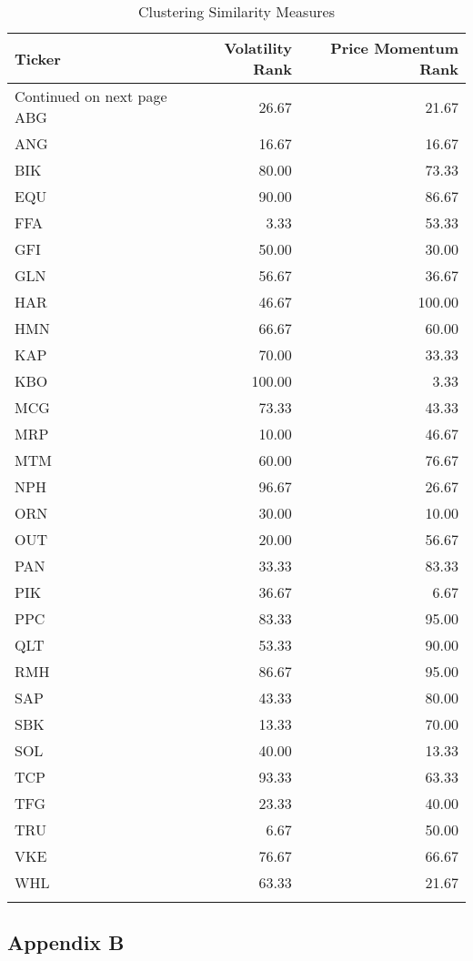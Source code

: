\documentclass[11pt,preprint, authoryear]{elsarticle}
\numberwithin{equation}{section}
\numberwithin{figure}{section}
\numberwithin{table}{section}
\begin{document}
\begingroup\fontsize{12pt}{13pt}\selectfont
\begin{longtable}{lrr}
  \toprule
Ticker & Volatility  Rank & Price Momentum Rank \\ 
  \hline 
\endhead 
\hline 
{\footnotesize Continued on next page} 
\endfoot 
\endlastfoot 
 \midrule
ABG & 26.67 & 21.67 \\ 
  ANG & 16.67 & 16.67 \\ 
  BIK & 80.00 & 73.33 \\ 
  EQU & 90.00 & 86.67 \\ 
  FFA & 3.33 & 53.33 \\ 
  GFI & 50.00 & 30.00 \\ 
  GLN & 56.67 & 36.67 \\ 
  HAR & 46.67 & 100.00 \\ 
  HMN & 66.67 & 60.00 \\ 
  KAP & 70.00 & 33.33 \\ 
  KBO & 100.00 & 3.33 \\ 
  MCG & 73.33 & 43.33 \\ 
  MRP & 10.00 & 46.67 \\ 
  MTM & 60.00 & 76.67 \\ 
  NPH & 96.67 & 26.67 \\ 
  ORN & 30.00 & 10.00 \\ 
  OUT & 20.00 & 56.67 \\ 
  PAN & 33.33 & 83.33 \\ 
  PIK & 36.67 & 6.67 \\ 
  PPC & 83.33 & 95.00 \\ 
  QLT & 53.33 & 90.00 \\ 
  RMH & 86.67 & 95.00 \\ 
  SAP & 43.33 & 80.00 \\ 
  SBK & 13.33 & 70.00 \\ 
  SOL & 40.00 & 13.33 \\ 
  TCP & 93.33 & 63.33 \\ 
  TFG & 23.33 & 40.00 \\ 
  TRU & 6.67 & 50.00 \\ 
  VKE & 76.67 & 66.67 \\ 
  WHL & 63.33 & 21.67 \\ 
   \bottomrule
\caption{Clustering Similarity Measures\label{tab1}} 
\end{longtable}
\endgroup

\hypertarget{appendix-b}{%
\subsection{Appendix B}\label{appendix-b}}


\end{document}
